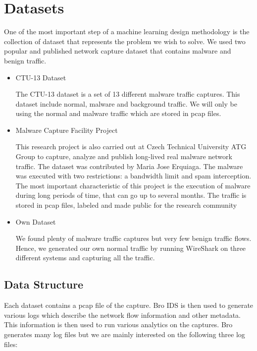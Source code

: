 \chapter{Datasets\label{chap:datasets}}

One of the most important step of a machine learning design methodology is the collection of dataset that represents the problem we wish to solve. We used two popular and published network capture dataset that contains malware and benign traffic.

\begin{itemize}
	\item CTU-13 Dataset \cite{GarciaGSZ14}
	
	The CTU-13 dataset is a set of 13 different malware traffic captures. This dataset include normal, malware and background traffic. We will only be using the normal and malware traffic which are stored in pcap files.
	
	\item Malware Capture Facility Project \cite{Erquiaga15}
	
	This research project is also carried out at Czech Technical University ATG Group to capture, analyze and publish long-lived real malware network traffic. The dataset was contributed by Maria Jose Erquiaga. The malware was executed with two restrictions: a bandwidth limit and spam interception. The most important characteristic of this project is the execution of malware during long periods of time, that can go up to several months. The traffic is stored in pcap files, labeled and made public for the research community
	
	\item Own Dataset
	
	We found plenty of malware traffic captures but very few benign traffic flows. Hence, we generated our own normal traffic by running WireShark on three different systems and capturing all the traffic.
\end{itemize}

\section{Data Structure}

Each dataset contains a pcap file of the capture. Bro IDS \cite{Bro} is then used to generate various logs which describe the network flow information and other metadata. This information is then used to run various analytics on the captures. Bro generates many log files but we are mainly interested on the following three log files:

